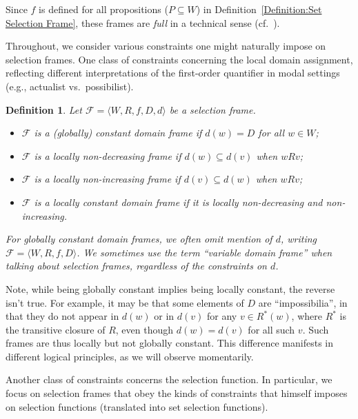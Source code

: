 \documentclass[12pt]{article}
\newtheorem{definition}{Definition}
\newcommand{\tup}[1]{\langle #1 \rangle}
\begin{document}
Since $f$ is defined for all propositions ($P\subseteq{W}$) in Definition~\ref{Definition:Set Selection Frame}, these frames are \textit{full} in a technical sense (cf.~\cite[p.~161]{Segerberg1989}).

Throughout, we consider various constraints one might naturally impose on selection frames. 
One class of constraints concerning the local domain assignment, reflecting different interpretations of the first-order quantifier in modal settings (e.g., actualist vs.\ possibilist). 

\begin{definition}
\label{Definition:Domains}
    Let $\mathcal{F} = \tup{W,R,f,D,d}$ be a selection frame. 
    \begin{itemize}
        \item $\mathcal{F}$ is a \emph{(globally) constant domain frame} if $d(w) = D$ for all $w \in W$; 
        \item $\mathcal{F}$ is a \emph{locally non-decreasing frame} if $d(w) \subseteq d(v)$ when $wRv$;
        \item $\mathcal{F}$ is a \emph{locally non-increasing frame} if $d(v) \subseteq d(w)$ when $wRv$;
        \item $\mathcal{F}$ is a \emph{locally constant domain frame} if it is locally non-decreasing and non-increasing. 
    \end{itemize}
    For globally constant domain frames, we often omit mention of $d$, writing $\mathcal{F}=\tup{W,R,f,D}$. 
    We sometimes use the term \emph{``variable domain frame''} when talking about selection frames, regardless of the constraints on $d$. 
\end{definition}

Note, while being globally constant implies being locally constant, the reverse isn't true. 
For example, it may be that some elements of $D$ are ``impossibilia'', in that they do not appear in $d(w)$ or in $d(v)$ for any $v \in R^*(w)$, where $R^*$ is the transitive closure of $R$, even though $d(w) = d(v)$ for all such $v$. 
Such frames are thus locally but not globally constant. 
This difference manifests in different logical principles, as we will observe momentarily. 

Another class of constraints concerns the selection function. 
In particular, we focus on selection frames that obey the kinds of constraints that \cite{Stalnaker1968theory} himself imposes on selection functions (translated into set selection functions). 
\end{document}
